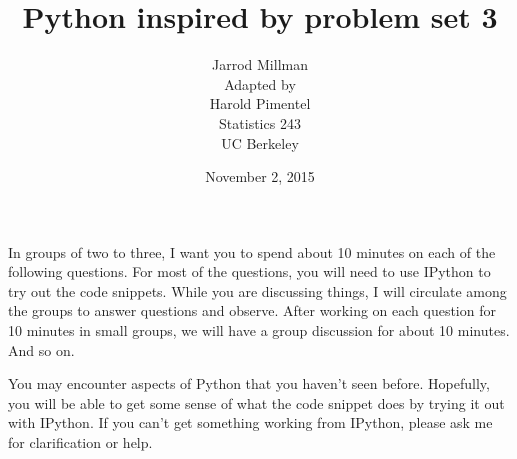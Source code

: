 \documentclass{article}
\title{Python inspired by problem set 3}
\date{November 2, 2015}
\author{Jarrod Millman\\{\small Adapted by}\\Harold Pimentel\\Statistics 243\\ UC Berkeley}
\begin{document}
\maketitle

In groups of two to three, I want you to spend about 10 minutes on each of the
following questions.  For most of the questions, you will need to use IPython
to try out the code snippets.  While you are discussing things, I will
circulate among the groups to answer questions and observe.  After working on
each question for 10 minutes in small groups, we will have a group discussion
for about 10 minutes.  And so on.

You may encounter aspects of Python that you haven't seen before.  Hopefully,
you will be able to get some sense of what the code snippet does by trying it
out with IPython.  If you can't get something working from IPython, please ask
me for clarification or help.
\end{document}
